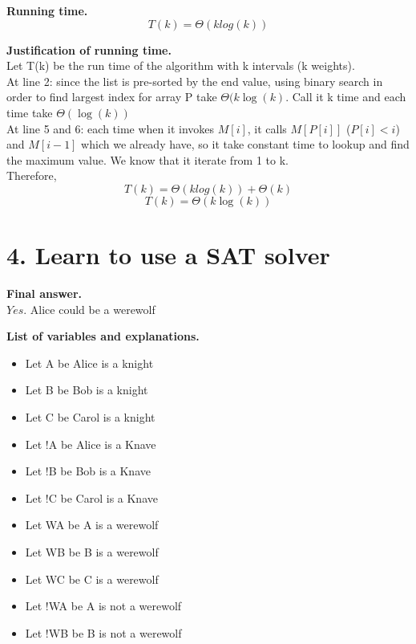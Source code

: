 \documentclass[11pt]{article}
\begin{document}
\noindent
\textbf{Running time.}
$$\boxed{T(k)= \Theta(klog(k))}$$ 

\noindent
\textbf{Justification of running time.}\\
Let T(k) be the run time of the algorithm with k intervals (k weights).\\
At line 2: since the list is pre-sorted by the end value, using binary search in order to find largest index for array P take $\Theta(k\log(k)$. Call it k time and each time take $\Theta(\log(k))$\\
At line 5 and 6: each time when it invokes $M[i]$, it calls $M[P[i]]$ ($P[i] < i$) and $M[i-1]$ which we already have, so it take constant time to lookup and find the maximum value. We know that it iterate from 1 to k.\\ 
Therefore, 
$$T(k) = \Theta(klog(k)) + \Theta(k)$$
$$\boxed{T(k) = \Theta(k\log(k))}$$


\newpage
\section*{4. Learn to use a SAT solver}

\noindent
\textbf{Final answer.}\\
$\boxed{Yes}$. Alice could be a werewolf

\noindent
\textbf{List of variables and explanations.}\\
\begin{itemize}
\item Let A be Alice is a knight
\item Let B be Bob is a knight
\item Let C be Carol is a knight
\item Let !A be Alice is a Knave
\item Let !B be Bob is a Knave
\item Let !C be Carol is a Knave
\item Let WA be A is a werewolf
\item Let WB be B is a werewolf
\item Let WC be C is a werewolf
\item Let !WA be A is not a werewolf
\item Let !WB be B is not a werewolf
\end{itemize}
\end{document}
